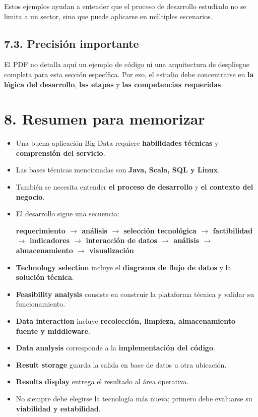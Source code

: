 \documentclass[8pt,a4paper,twocolumn]{article}
\begin{document}
Estos ejemplos ayudan a entender que el proceso de desarrollo estudiado no se limita a un sector, sino que puede aplicarse en múltiples escenarios.

\subsection*{7.3. Precisión importante}

El PDF no detalla aquí un ejemplo de código ni una arquitectura de despliegue completa para esta sección específica. Por eso, el estudio debe concentrarse en \textbf{la lógica del desarrollo}, \textbf{las etapas} y \textbf{las competencias requeridas}.

\section*{8. Resumen para memorizar}

\begin{itemize}[leftmargin=*]
    \item Una buena aplicación Big Data requiere \textbf{habilidades técnicas} y \textbf{comprensión del servicio}.
    \item Las bases técnicas mencionadas son \textbf{Java, Scala, SQL y Linux}.
    \item También se necesita entender \textbf{el proceso de desarrollo} y \textbf{el contexto del negocio}.
    \item El desarrollo sigue una secuencia:
    \begin{center}
        \textbf{requerimiento $\rightarrow$ análisis $\rightarrow$ selección tecnológica $\rightarrow$ factibilidad $\rightarrow$ indicadores $\rightarrow$ interacción de datos $\rightarrow$ análisis $\rightarrow$ almacenamiento $\rightarrow$ visualización}
    \end{center}
    \item \textbf{Technology selection} incluye el \textbf{diagrama de flujo de datos} y la \textbf{solución técnica}.
    \item \textbf{Feasibility analysis} consiste en construir la plataforma técnica y validar su funcionamiento.
    \item \textbf{Data interaction} incluye \textbf{recolección, limpieza, almacenamiento fuente y middleware}.
    \item \textbf{Data analysis} corresponde a la \textbf{implementación del código}.
    \item \textbf{Result storage} guarda la salida en base de datos u otra ubicación.
    \item \textbf{Results display} entrega el resultado al área operativa.
    \item No siempre debe elegirse la tecnología más nueva; primero debe evaluarse su \textbf{viabilidad y estabilidad}.
\end{itemize}
\end{document}

